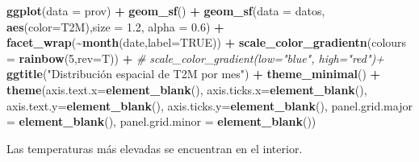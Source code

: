 \documentclass[12pt,a4paper,]{book}
\newenvironment{Shaded}{\begin{snugshade}}{\end{snugshade}}
\newcommand{\AttributeTok}[1]{\textcolor[rgb]{0.13,0.29,0.53}{#1}}
\newcommand{\CommentTok}[1]{\textcolor[rgb]{0.56,0.35,0.01}{\textit{#1}}}
\newcommand{\ConstantTok}[1]{\textcolor[rgb]{0.56,0.35,0.01}{#1}}
\newcommand{\DecValTok}[1]{\textcolor[rgb]{0.00,0.00,0.81}{#1}}
\newcommand{\FloatTok}[1]{\textcolor[rgb]{0.00,0.00,0.81}{#1}}
\newcommand{\FunctionTok}[1]{\textcolor[rgb]{0.13,0.29,0.53}{\textbf{#1}}}
\newcommand{\NormalTok}[1]{#1}
\newcommand{\SpecialCharTok}[1]{\textcolor[rgb]{0.81,0.36,0.00}{\textbf{#1}}}
\newcommand{\StringTok}[1]{\textcolor[rgb]{0.31,0.60,0.02}{#1}}
\numberwithin{dummy}{section}
\theoremstyle{ocrenumbox}
\theoremstyle{blacknumex}
\theoremstyle{blacknumbox}
\theoremstyle{ocrenum}
\theoremstyle{ocrenum}
\begin{document}
\begin{Shaded}
\begin{Highlighting}[]
\FunctionTok{ggplot}\NormalTok{(}\AttributeTok{data =}\NormalTok{ prov) }\SpecialCharTok{+} 
  \FunctionTok{geom\_sf}\NormalTok{() }\SpecialCharTok{+}
  \FunctionTok{geom\_sf}\NormalTok{(}\AttributeTok{data =}\NormalTok{ datos, }\FunctionTok{aes}\NormalTok{(}\AttributeTok{color=}\NormalTok{T2M),}\AttributeTok{size =} \FloatTok{1.2}\NormalTok{, }\AttributeTok{alpha =} \FloatTok{0.6}\NormalTok{) }\SpecialCharTok{+}
  \FunctionTok{facet\_wrap}\NormalTok{(}\SpecialCharTok{\textasciitilde{}}\FunctionTok{month}\NormalTok{(date,}\AttributeTok{label=}\ConstantTok{TRUE}\NormalTok{)) }\SpecialCharTok{+} 
  \FunctionTok{scale\_color\_gradientn}\NormalTok{(}\AttributeTok{colours =} \FunctionTok{rainbow}\NormalTok{(}\DecValTok{5}\NormalTok{,}\AttributeTok{rev=}\NormalTok{T)) }\SpecialCharTok{+}
  \CommentTok{\# scale\_color\_gradient(low="blue", high="red")+}
  \FunctionTok{ggtitle}\NormalTok{(}\StringTok{"Distribución espacial de T2M por mes"}\NormalTok{) }\SpecialCharTok{+} 
  \FunctionTok{theme\_minimal}\NormalTok{() }\SpecialCharTok{+}
  \FunctionTok{theme}\NormalTok{(}\AttributeTok{axis.text.x=}\FunctionTok{element\_blank}\NormalTok{(),}
        \AttributeTok{axis.ticks.x=}\FunctionTok{element\_blank}\NormalTok{(),}
        \AttributeTok{axis.text.y=}\FunctionTok{element\_blank}\NormalTok{(),}
        \AttributeTok{axis.ticks.y=}\FunctionTok{element\_blank}\NormalTok{(),}
        \AttributeTok{panel.grid.major =} \FunctionTok{element\_blank}\NormalTok{(),}
        \AttributeTok{panel.grid.minor =} \FunctionTok{element\_blank}\NormalTok{())}
\end{Highlighting}
\end{Shaded}

Las temperaturas más elevadas se encuentran en el interior.
\end{document}

